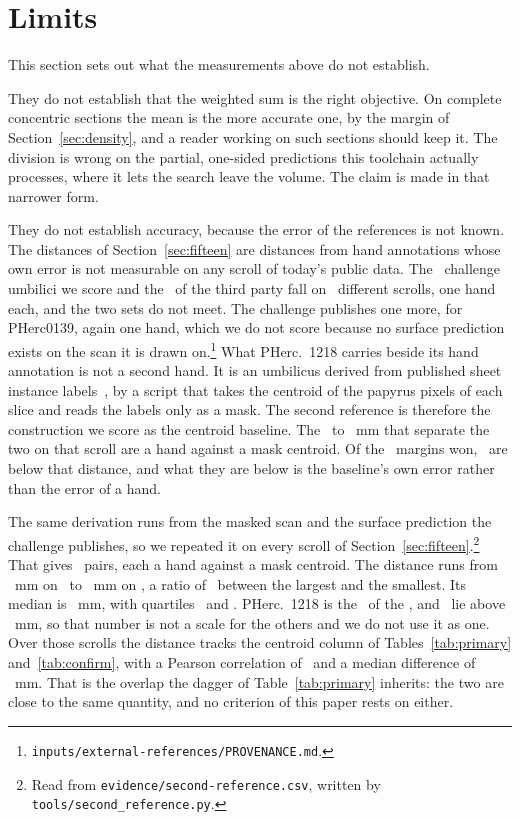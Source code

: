 \section{Limits}
\label{sec:notdone}
This section sets out what the measurements above do not establish.

They do not establish that the weighted sum is the right objective. On complete concentric
sections the mean is the more accurate one, by the margin of Section~\ref{sec:density}, and a
reader working on such sections should keep it. The division is wrong on the partial, one-sided
predictions this toolchain actually processes, where it lets the search leave the volume. The
claim is made in that narrower form.

They do not establish accuracy, because the error of the references is not known. The distances of
Section~\ref{sec:fifteen} are distances from hand annotations whose own error is not measurable on
any scroll of today's public data. The \SecRefChallengeHands\ challenge umbilici we score and the
\SecRefThirdPartyHands\ of the third party fall on \SecRefHandScrolls\ different scrolls, one hand
each, and the two sets do not meet. The challenge publishes one more, for PHerc0139, again one
hand, which we do not score because no surface prediction exists on the scan it is drawn
on.\footnote{\texttt{inputs/external-references/PROVENANCE.md}.} What PHerc.\ 1218 carries beside its hand annotation is
not a second hand. It is an umbilicus derived from published sheet instance labels~\cite{dopico},
by a script that takes the centroid of the papyrus pixels of each slice and reads the labels only
as a mask. The second reference is therefore the construction we score as the centroid baseline.
The \UmbReferenceSpreadLow\ to \UmbReferenceSpreadHigh~mm that separate the two on that scroll are
a hand against a mask centroid. Of the \RevKWonTotal\ margins won, \RevKUnderSpreadTotal\ are below
that distance, and what they are below is the baseline's own error rather than the error of a hand.

The same derivation runs from the masked scan and the surface prediction the challenge publishes,
so we repeated it on every scroll of Section~\ref{sec:fifteen}.\footnote{Read from
\texttt{evidence/second-reference.csv}, written by \texttt{tools/second\_reference.py}.} That gives
\SecRefScrolls\ pairs, each a hand against a mask centroid. The distance runs from \SecRefMinMm~mm
on \SecRefMinScroll\ to \SecRefMaxMm~mm on \SecRefMaxScroll, a ratio of \SecRefRatio\ between the
largest and the smallest. Its median is \SecRefMedianMm~mm, with quartiles \SecRefQOneMm\ and
\SecRefQThreeMm. PHerc.\ 1218 is the \SecRefRankWord\ of the \SecRefScrolls, and
\SecRefAboveSpread\ lie above \UmbReferenceSpreadHigh~mm, so that number is not a scale for the
others and we do not use it as one. Over those scrolls the distance tracks the centroid column of
Tables~\ref{tab:primary} and~\ref{tab:confirm}, with a Pearson correlation of \SecRefPearson\ and a
median difference of \SecRefGapMedianMm~mm. That is the overlap the dagger of
Table~\ref{tab:primary} inherits: the two are close to the same quantity, and no criterion of this
paper rests on either.

